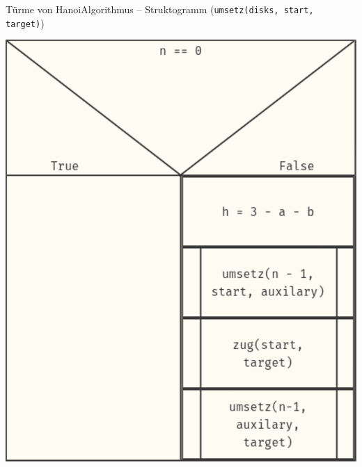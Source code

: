 \documentclass[xelatex,aspectratio=169]{beamer}
\begin{document}
\begin{frame}{Türme von Hanoi}{Algorithmus -- Struktogramm (\texttt{umsetz(disks, start, target)})}
  \begin{center}
    \includegraphics[height=0.8\textheight]{fig/algorithmus_tower_struktogramm.pdf}
  \end{center}
\end{frame}
\end{document}
